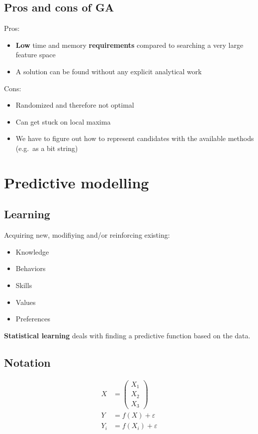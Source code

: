 \documentclass{article}
\begin{document}
        \subsection{Pros and cons of GA}
        Pros:
        \begin{itemize}
            \item \textbf{Low} time and memory \textbf{requirements} compared to searching a very large feature space
            \item A solution can be found without any explicit analytical work
        \end{itemize}
        Cons:
        \begin{itemize}
            \item Randomized and therefore not optimal
            \item Can get stuck on local maxima
            \item We have to figure out how to represent candidates with the available methods (e.g.\ as a bit string)
        \end{itemize}
    \newpage

\section{Predictive modelling}
    \subsection{Learning}
    Acquiring new, modifiying and/or reinforcing existing:
    \begin{itemize}
        \item Knowledge
        \item Behaviors
        \item Skills
        \item Values
        \item Preferences
    \end{itemize}
    \textbf{Statistical learning} deals with finding a predictive function based on the data.
    
    \subsection{Notation}
    \begin{align*}
        X &= \begin{pmatrix}
            X_1 \\
            X_2 \\
            X_3
        \end{pmatrix} \\
        Y &= f(X) + \varepsilon \\
        Y_i &= f(X_i) + \varepsilon
    \end{align*}
\end{document}
